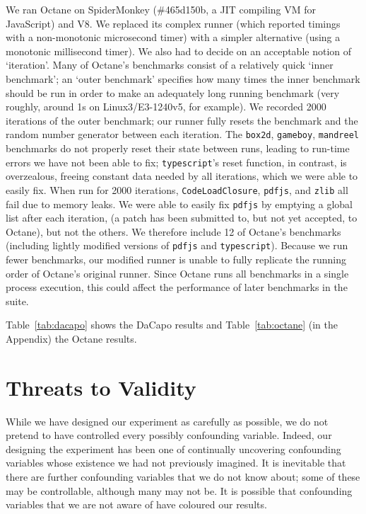 \documentclass[preprint,numbers,10pt]{sigplanconf}
\newcommand{\bencherseven}{Linux3/E3-1240v5\xspace}
\begin{document}
We ran Octane on SpiderMonkey (\#465d150b, a JIT compiling VM for JavaScript) and V8.
We replaced its complex runner (which reported timings with a non-monotonic
microsecond timer) with a simpler alternative (using a monotonic millisecond
timer). We also had to decide on an acceptable notion of `iteration'. Many of Octane's
benchmarks consist of a relatively quick `inner benchmark'; an `outer benchmark'
specifies how many times the inner benchmark should be run in order to make an
adequately long running benchmark (very roughly, around 1s on \bencherseven, for
example). We recorded 2000 iterations of the outer benchmark; our runner
fully resets the benchmark and the random number generator between each
iteration. The \texttt{box2d}, \texttt{gameboy}, \texttt{mandreel} benchmarks do
not properly reset their state between runs, leading to run-time errors we have
not been able to fix; \texttt{typescript}'s reset function, in contrast, is
overzealous, freeing constant data needed by all iterations, which we were able
to easily fix. When run for 2000 iterations, \texttt{CodeLoadClosure},
\texttt{pdfjs}, and \texttt{zlib} all fail due to memory leaks. We were able to
easily fix \texttt{pdfjs} by emptying a global list after each iteration,
(a patch has been submitted to, but not yet accepted, to Octane), but not the
others. We therefore include 12 of Octane's benchmarks (including lightly
modified versions of \texttt{pdfjs} and \texttt{typescript}).
Because we run fewer benchmarks, our modified runner is unable to fully
replicate the running order of Octane's original runner. Since Octane runs all
benchmarks in a single process execution, this could affect the performance of
later benchmarks in the suite.

Table~\ref{tab:dacapo} shows the DaCapo results and Table~\ref{tab:octane} (in
the Appendix) the Octane results.


\section{Threats to Validity}
\label{sec:threats}

While we have designed our experiment as carefully as possible, we do not
pretend to have controlled every possibly confounding variable. Indeed, our
designing the experiment has been one of continually uncovering
confounding variables whose existence we had not previously imagined. It
is inevitable that there are further confounding variables that we
do not know about; some of these may be controllable, although many may not be.
It is possible that confounding variables that we are not aware of have
coloured our results.
\end{document}
